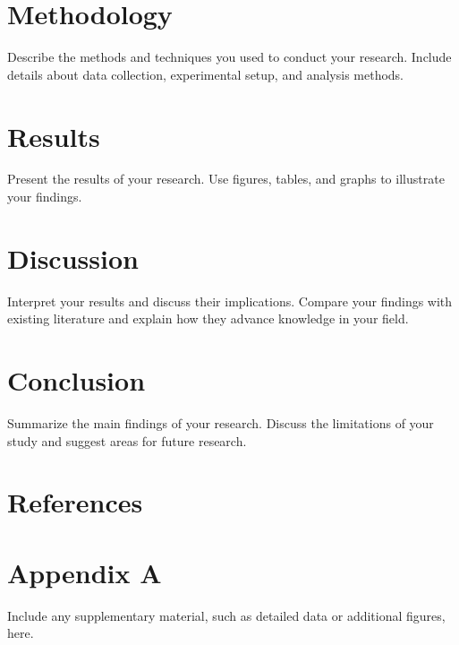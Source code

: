 \documentclass{article}
\begin{document}
\newpage

\section{Methodology}
Describe the methods and techniques you used to conduct your research. Include details about data collection, experimental setup, and analysis methods.

\newpage

\section{Results}
Present the results of your research. Use figures, tables, and graphs to illustrate your findings.

\newpage

\section{Discussion}
Interpret your results and discuss their implications. Compare your findings with existing literature and explain how they advance knowledge in your field.

\newpage

\section{Conclusion}
Summarize the main findings of your research. Discuss the limitations of your study and suggest areas for future research.

\newpage

\section*{References}

\newpage

\appendix
\section{Appendix A}
Include any supplementary material, such as detailed data or additional figures, here.
\end{document}
